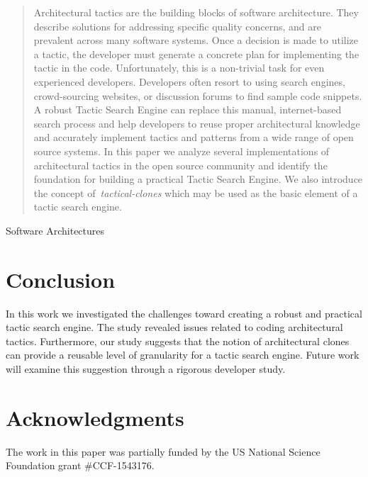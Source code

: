\documentclass{sig-alternate}
\newcommand{\dan}[1]{\textcolor{blue}{{\it [Dan says: #1]}}}
\begin{document}
\begin{abstract}
Architectural tactics are the building blocks of software architecture. They describe solutions for addressing specific quality concerns, and are prevalent across many software systems. Once a decision is made to utilize a tactic, the developer must generate a concrete plan for implementing the tactic in the code. Unfortunately, this is a non-trivial task for even experienced developers. Developers often resort to using search engines, crowd-sourcing websites, or discussion forums to find sample code snippets. A robust Tactic Search Engine can replace this manual, internet-based search process and help developers to reuse proper architectural knowledge and accurately implement tactics and patterns from a wide range of open source systems. In this paper we analyze several implementations of architectural tactics in the open source community and identify the foundation for building a practical Tactic Search Engine. We also introduce the concept of~\emph{tactical-clones} which may be used as the basic element of a tactic search engine.




\end{abstract}





 Software Architectures









\section{Conclusion}
\label{sec:Conclusion}
In this work we investigated the challenges toward creating a robust and practical tactic search engine. The study revealed issues related to coding architectural tactics. Furthermore, our study suggests that the notion of architectural clones can provide a reusable level of granularity for a tactic search engine. Future work will examine this suggestion through a rigorous developer study.

\section{Acknowledgments}
The work in this paper was partially funded by the US
National Science Foundation grant \#CCF-1543176. 


\balance





\end{document}
